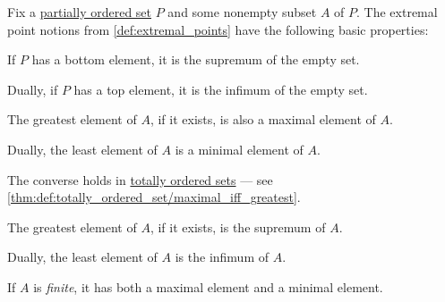 \begin{proposition}\label{thm:def:extremal_points}
  Fix a \hyperref[def:partially_ordered_set]{partially ordered set} \( P \) and some nonempty subset \( A \) of \( P \). The extremal point notions from \cref{def:extremal_points} have the following basic properties:
  \begin{thmenum}
     If \( P \) has a bottom element, it is the supremum of the empty set.

    Dually, if \( P \) has a top element, it is the infimum of the empty set.

     The greatest element of \( A \), if it exists, is also a maximal element of \( A \).

    Dually, the least element of \( A \) is a minimal element of \( A \).

    The converse holds in \hyperref[def:totally_ordered_set]{totally ordered sets} --- see \cref{thm:def:totally_ordered_set/maximal_iff_greatest}.

     The greatest element of \( A \), if it exists, is the supremum of \( A \).

    Dually, the least element of \( A \) is the infimum of \( A \).

     If \( A \) is \emph{finite}, it has both a maximal element and a minimal element.
  \end{thmenum}
\end{proposition}
